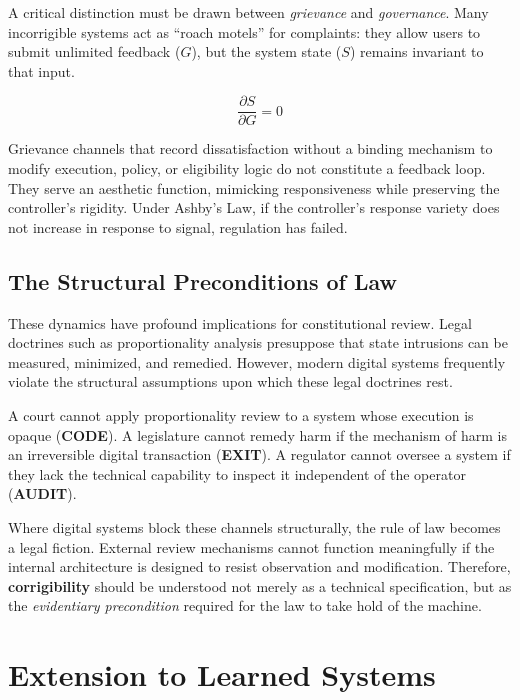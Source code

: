 \documentclass{article}
\begin{document}
A critical distinction must be drawn between \textit{grievance} and \textit{governance}. Many incorrigible systems act as ``roach motels'' for complaints: they allow users to submit unlimited feedback ($G$), but the system state ($S$) remains invariant to that input.

\begin{equation}
\frac{\partial S}{\partial G} = 0
\end{equation}

Grievance channels that record dissatisfaction without a binding mechanism to modify execution, policy, or eligibility logic do not constitute a feedback loop. They serve an aesthetic function, mimicking responsiveness while preserving the controller's rigidity. Under Ashby's Law, if the controller's response variety does not increase in response to signal, regulation has failed.

\subsection{The Structural Preconditions of Law}

These dynamics have profound implications for constitutional review. Legal doctrines such as proportionality analysis presuppose that state intrusions can be measured, minimized, and remedied. However, modern digital systems frequently violate the structural assumptions upon which these legal doctrines rest.

A court cannot apply proportionality review to a system whose execution is opaque (\textbf{CODE}). A legislature cannot remedy harm if the mechanism of harm is an irreversible digital transaction (\textbf{EXIT}). A regulator cannot oversee a system if they lack the technical capability to inspect it independent of the operator (\textbf{AUDIT}).

Where digital systems block these channels structurally, the rule of law becomes a legal fiction. External review mechanisms cannot function meaningfully if the internal architecture is designed to resist observation and modification. Therefore, \textbf{corrigibility} should be understood not merely as a technical specification, but as the \textit{evidentiary precondition} required for the law to take hold of the machine.

\section{Extension to Learned Systems}
\end{document}
